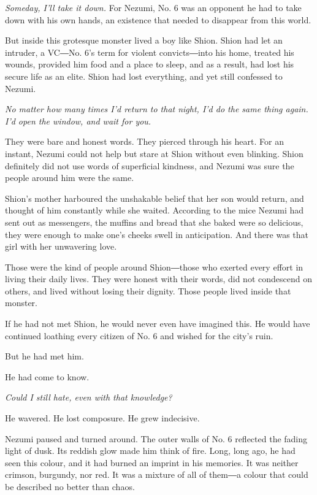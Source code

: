 \emph{Someday, I'll take it down.} For Nezumi, No. 6 was an opponent he had to
take down with his own hands, an existence that needed to disappear from
this world.

But inside this grotesque monster lived a boy like Shion. Shion had let
an intruder, a VC―No. 6's term for violent convicts―into his home,
treated his wounds, provided him food and a place to sleep, and as a
result, had lost his secure life as an elite. Shion had lost everything,
and yet still confessed to Nezumi.

\emph{No matter how many times I'd return to that night, I'd do the same
thing again. I'd open the window, and wait for you.}

They were bare and honest words. They pierced through his heart. For an
instant, Nezumi could not help but stare at Shion without even blinking.
Shion definitely did not use words of superficial kindness, and Nezumi
was sure the people around him were the same.

Shion's mother harboured the unshakable belief that her son would
return, and thought of him constantly while she waited. According to the
mice Nezumi had sent out as messengers, the muffins and bread that she
baked were so delicious, they were enough to make one's cheeks swell in
anticipation. And there was that girl with her unwavering love.

Those were the kind of people around Shion―those who exerted every
effort in living their daily lives. They were honest with their words,
did not condescend on others, and lived without losing their dignity.
Those people lived inside that monster.

If he had not met Shion, he would never even have imagined this. He
would have continued loathing every citizen of No. 6 and wished for the
city's ruin.

But he had met him.

He had come to know.

\emph{Could I still hate, even with that knowledge?}

He wavered. He lost composure. He grew indecisive.

Nezumi paused and turned around. The outer walls of No. 6 reflected the
fading light of dusk. Its reddish glow made him think of fire. Long,
long ago, he had seen this colour, and it had burned an imprint in his
memories. It was neither crimson, burgundy, nor red. It was a mixture of
all of them―a colour that could be described no better than chaos.

